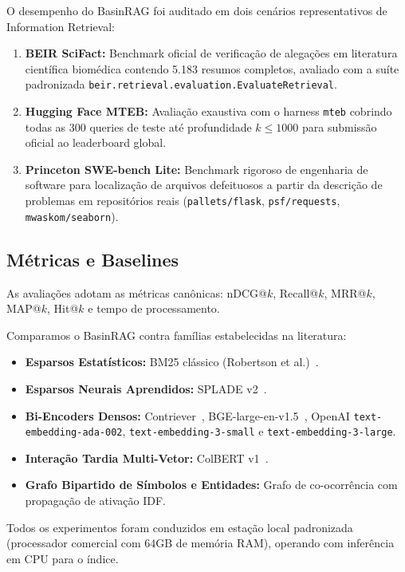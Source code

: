 \documentclass[10pt,twocolumn]{article}
\theoremstyle{definition}
\begin{document}
O desempenho do BasinRAG foi auditado em dois cenários representativos de Information Retrieval:

\begin{enumerate}
    \item \textbf{BEIR SciFact:} Benchmark oficial de verificação de alegações em literatura científica biomédica contendo 5.183 resumos completos, avaliado com a suíte padronizada \texttt{beir.retrieval.evaluation.EvaluateRetrieval}.
    \item \textbf{Hugging Face MTEB:} Avaliação exaustiva com o harness \texttt{mteb} cobrindo todas as 300 queries de teste até profundidade $k \le 1000$ para submissão oficial ao leaderboard global.
    \item \textbf{Princeton SWE-bench Lite:} Benchmark rigoroso de engenharia de software para localização de arquivos defeituosos a partir da descrição de problemas em repositórios reais (\texttt{pallets/flask}, \texttt{psf/requests}, \texttt{mwaskom/seaborn}).
\end{enumerate}

\subsection{Métricas e Baselines}

As avaliações adotam as métricas canônicas: nDCG@$k$, Recall@$k$, MRR@$k$, MAP@$k$, Hit@$k$ e tempo de processamento. 

Comparamos o BasinRAG contra famílias estabelecidas na literatura:
\begin{itemize}
    \item \textbf{Esparsos Estatísticos:} BM25 clássico (Robertson et al.)~\cite{robertson2009probabilistic}.
    \item \textbf{Esparsos Neurais Aprendidos:} SPLADE v2~\cite{formal2021splade}.
    \item \textbf{Bi-Encoders Densos:} Contriever~\cite{izacard2021unsupervised}, BGE-large-en-v1.5~\cite{xiao2023c}, OpenAI \texttt{text-embedding-ada-002}, \texttt{text-embedding-3-small} e \texttt{text-embedding-3-large}.
    \item \textbf{Interação Tardia Multi-Vetor:} ColBERT v1~\cite{khattab2020colbert}.
    \item \textbf{Grafo Bipartido de Símbolos e Entidades:} Grafo de co-ocorrência com propagação de ativação IDF.
\end{itemize}

Todos os experimentos foram conduzidos em estação local padronizada (processador comercial com 64GB de memória RAM), operando com inferência em CPU para o índice.
\end{document}
